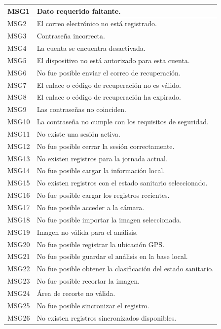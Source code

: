 \begin{longtable}{|p{2.5cm}|p{10.5cm}|}
MSG1 & Dato requerido faltante. \\ \hline
MSG2 & El correo electrónico no está registrado. \\ \hline
MSG3 & Contraseña incorrecta. \\ \hline
MSG4 & La cuenta se encuentra desactivada. \\ \hline
MSG5 & El dispositivo no está autorizado para esta cuenta. \\ \hline
MSG6 & No fue posible enviar el correo de recuperación. \\ \hline
MSG7 & El enlace o código de recuperación no es válido. \\ \hline
MSG8 & El enlace o código de recuperación ha expirado. \\ \hline
MSG9 & Las contraseñas no coinciden. \\ \hline
MSG10 & La contraseña no cumple con los requisitos de seguridad. \\ \hline
MSG11 & No existe una sesión activa. \\ \hline
MSG12 & No fue posible cerrar la sesión correctamente. \\ \hline
MSG13 & No existen registros para la jornada actual. \\ \hline
MSG14 & No fue posible cargar la información local. \\ \hline
MSG15 & No existen registros con el estado sanitario seleccionado. \\ \hline
MSG16 & No fue posible cargar los registros recientes. \\ \hline
MSG17 & No fue posible acceder a la cámara. \\ \hline
MSG18 & No fue posible importar la imagen seleccionada. \\ \hline
MSG19 & Imagen no válida para el análisis. \\ \hline
MSG20 & No fue posible registrar la ubicación GPS. \\ \hline
MSG21 & No fue posible guardar el análisis en la base local. \\ \hline
MSG22 & No fue posible obtener la clasificación del estado sanitario. \\ \hline
MSG23 & No fue posible recortar la imagen. \\ \hline
MSG24 & Área de recorte no válida. \\ \hline
MSG25 & No fue posible sincronizar el registro. \\ \hline
MSG26 & No existen registros sincronizados disponibles. \\ \hline

\end{longtable}
